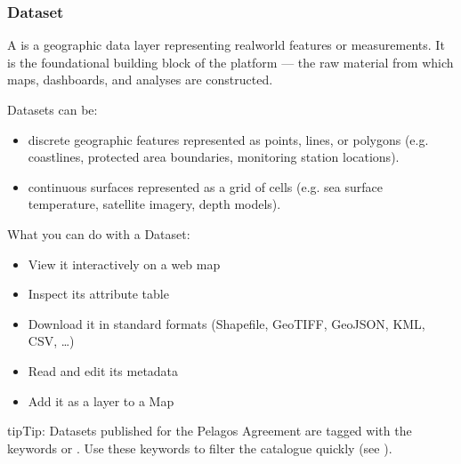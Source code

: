 \documentclass[letterpaper,10pt,english]{sphinxmanual}
\begin{document}
\subsubsection{Dataset}
\label{\detokenize{en/01_welcome:dataset}}
\sphinxAtStartPar
A  is a geographic data layer representing real\sphinxhyphen{}world features or measurements.
It is the foundational building block of the platform — the raw material from which maps,
dashboards, and analyses are constructed.

\sphinxAtStartPar
Datasets can be:
\begin{itemize}
\item {} 
\sphinxAtStartPar
{} \textendash{} discrete geographic features represented as points, lines, or polygons
(e.g. coastlines, protected area boundaries, monitoring station locations).

\item {} 
\sphinxAtStartPar
{} \textendash{} continuous surfaces represented as a grid of cells
(e.g. sea surface temperature, satellite imagery, depth models).

\end{itemize}

\sphinxAtStartPar
What you can do with a Dataset:
\begin{itemize}
\item {} 
\sphinxAtStartPar
View it interactively on a web map

\item {} 
\sphinxAtStartPar
Inspect its attribute table

\item {} 
\sphinxAtStartPar
Download it in standard formats (Shapefile, GeoTIFF, GeoJSON, KML, CSV, …)

\item {} 
\sphinxAtStartPar
Read and edit its metadata

\item {} 
\sphinxAtStartPar
Add it as a layer to a Map

\end{itemize}

\begin{sphinxadmonition}{tip}{Tip:}
\sphinxAtStartPar
Datasets published for the Pelagos Agreement are tagged with the keywords
 or . Use these keywords to filter
the catalogue quickly (see {\hyperref[\detokenize{en/02_find_and_visualize:find-en}]{}}).
\end{sphinxadmonition}
\end{document}
